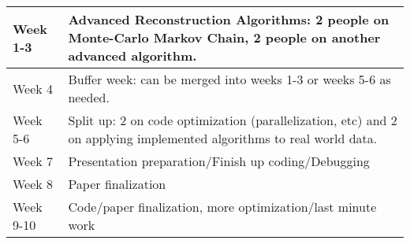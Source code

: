\documentclass[10pt]{article}
\begin{document}
\noindent
{}
\begin{tabular}{ | l | p{10cm} |}
\hline
Week 1-3 & Advanced Reconstruction Algorithms: 2 people on Monte-Carlo Markov Chain,
2 people on another advanced algorithm.\\ 
\hline
Week 4 & Buffer week: can be merged into weeks 1-3 or weeks 5-6 as needed.\\
\hline
Week 5-6 & Split up: 2 on code optimization (parallelization, etc) and 2 on applying implemented
algorithms to real world data.\\
\hline
Week 7 & Presentation preparation/Finish up coding/Debugging\\
\hline
Week 8 & Paper finalization\\
\hline
Week 9-10 & Code/paper finalization, more optimization/last minute work\\
\hline
\end{tabular}
\end{document}
